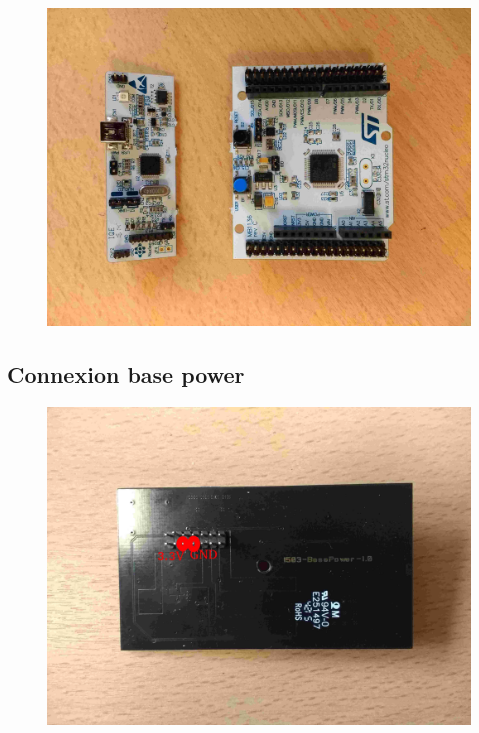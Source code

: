 \documentclass{article}
\begin{document}
\begin{figure}[H]
\begin{center}
\advance\leftskip-3cm
\advance\rightskip-3cm
\includegraphics[keepaspectratio=true,scale=0.1]{nucleo_debug.jpg}
\label{visina8}
\end{center}\end{figure}

\subsection{Connexion base power}

\begin{figure}[H]
\begin{center}
\advance\leftskip-3cm
\advance\rightskip-3cm
\includegraphics[keepaspectratio=true,scale=0.1]{base_power.jpg}
\label{visina8}
\end{center}\end{figure}
\end{document}
